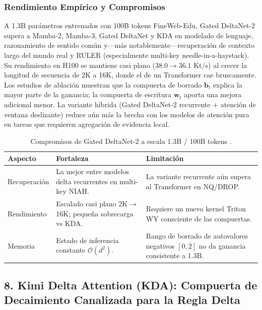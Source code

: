 \subsubsection{Rendimiento Empírico y Compromisos}

A 1.3B parámetros entrenados con 100B tokens FineWeb-Edu, Gated DeltaNet-2 supera a Mamba-2, Mamba-3, Gated DeltaNet y KDA en modelado de lenguaje, razonamiento de sentido común y---más notablemente---recuperación de contexto largo del mundo real y RULER (especialmente multi-key needle-in-a-haystack). Su rendimiento en H100 se mantiene casi plano ($38.0 \to 36.1$ Kt/s) al crecer la longitud de secuencia de 2K a 16K, donde el de un Transformer cae bruscamente. Los estudios de ablación muestran que la compuerta de borrado $\mathbf{b}_t$ explica la mayor parte de la ganancia; la compuerta de escritura $\mathbf{w}_t$ aporta una mejora adicional menor. La variante híbrida (Gated DeltaNet-2 recurrente + atención de ventana deslizante) reduce aún más la brecha con los modelos de atención pura en tareas que requieren agregación de evidencia local.

\begin{table}[H]
\centering
\footnotesize
\begin{tabularx}{\linewidth}{lXX}
\toprule
\textbf{Aspecto} & \textbf{Fortaleza} & \textbf{Limitación} \\
\midrule
Recuperación & La mejor entre modelos delta recurrentes en multi-key NIAH. & La variante recurrente aún supera al Transformer en NQ/DROP. \\
Rendimiento & Escalado casi plano 2K$\to$16K; pequeña sobrecarga vs KDA. & Requiere un nuevo kernel Triton WY consciente de las compuertas. \\
Memoria & Estado de inferencia constante $\mathcal{O}(d^2)$. & Rango de borrado de autovalores negativos $[0,2]$ no da ganancia consistente a 1.3B. \\
\bottomrule
\end{tabularx}
\caption{Compromisos de Gated DeltaNet-2 a escala 1.3B / 100B tokens \citep{hatamizadeh_gated_deltanet2_2026}.}
\label{tab:gated-deltanet2-tradeoffs-es}
\end{table}

\normalsize

\subsection{8. Kimi Delta Attention (KDA): Compuerta de Decaimiento Canalizada para la Regla Delta}

